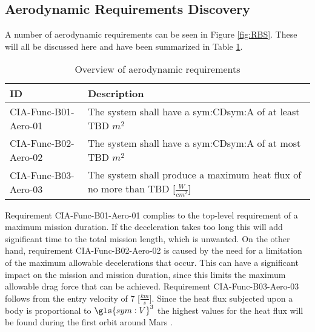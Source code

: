 \subsection{Aerodynamic Requirements Discovery} 
\label{sec:aero}
A number of aerodynamic requirements can be seen in Figure \ref{fig:RBS}. These will all be discussed here and have been summarized in Table \ref{tab:aeroreqs}. 


\begin{table}[h]
	\caption{Overview of aerodynamic requirements}	
	\begin{tabular}{|p{}|p{}|}
		\hline
		ID & Description \\
		\hline \hline
		CIA-Func-B01-Aero-01 & The system shall have a \gls{sym:CD}\gls{sym:A} of at least TBD $m^{2}$ \\ \hline
		CIA-Func-B02-Aero-02 & The system shall have a \gls{sym:CD}\gls{sym:A} of at most TBD $m^{2}$ \\ \hline
		CIA-Func-B03-Aero-03 & The system shall produce a maximum heat flux of no more than TBD [$\frac{W}{cm^{2}}$] \\ \hline
	\end{tabular}
\label{tab:aeroreqs}
\end{table}
Requirement CIA-Func-B01-Aero-01 complies to the top-level requirement of a maximum mission duration. If the deceleration takes too long this will add significant time to the total mission length, which is unwanted.
On the other hand, requirement CIA-Func-B02-Aero-02 is caused by the need for a limitation of the maximum allowable decelerations that occur. This can have a significant impact on the mission and mission duration, since this limits the maximum allowable drag force that can be achieved.
Requirement CIA-Func-B03-Aero-03 follows from the entry velocity of 7 [$\frac{km}{s}$]. Since the heat flux subjected upon a body is proportional to $\gls{sym:V}^{3}$ the highest values for the heat flux will be found during the first orbit around Mars \cite{Tauber1986}.